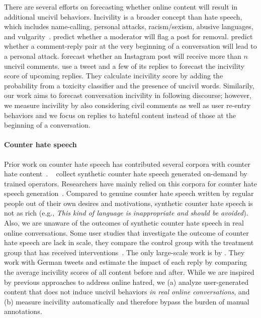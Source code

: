 \documentclass[11pt]{article}
\begin{document}
	There are several efforts on forecasting whether online content will result in additional uncivil behaviors. 
	Incivility is a broader concept than hate speech, which includes name-calling, personal attacks, racism/sexism, abusive languages, and vulgarity~\cite{sadeque-etal-2019-incivility,davidson-etal-2020-developing}.
	\citet{10.1145/2998181.2998213} predict whether a moderator will flag a post for removal.
	\citet{zhang-etal-2018-conversations} predict whether a comment-reply pair at the very beginning of a conversation will lead to a personal attack.
	\citet{DBLP:conf/icwsm/LiuGHC18} forecast whether an Instagram post will receive more than $n$ uncivil comments.
	\citet{DBLP:conf/kdd/DahiyaSSGCEMB021} use a tweet and a few of its replies to forecast the incivility score of upcoming replies.
	They calculate incivility score by adding the probability from a toxicity classifier and the presence of uncivil words.
	Similarily, our work aims to forecast conversation incivility in following discourse; 
	however, we measure incivility by also considering civil comments as well as user re-entry behaviors
	and 
	we focus on replies to hateful content instead of those at the beginning of a conversation.
	
	\paragraph{Counter hate speech}
	Prior work on counter hate speech has contributed several corpora with counter hate content~\cite{DBLP:conf/icwsm/MathewSTRSMG019,qian-etal-2019-benchmark,chung-etal-2019-conan,yu-etal-2022-hate}.
	~\citet{chung-etal-2019-conan} collect synthetic counter hate speech generated on-demand by trained operators.
	Researchers have mainly relied on this corpora for counter hate speech  generation~\cite{tekiroglu-etal-2020-generating,fanton-etal-2021-human,zhu-bhat-2021-generate,ashida-komachi-2022-towards}. 
	Compared to genuine counter hate speech written by regular people out of their own desires and motivations, synthetic counter hate speech is not as rich (e.g., \emph{This kind of language is inappropriate and should be avoided}).
	Also, we are unaware of the outcomes of synthetic counter hate speech in real online conversations.
	Some user studies that investigate the outcome of counter hate speech are lack in scale, they compare the control group with the treatment group that has received interventions~\cite{munger2017tweetment,hangartner2021empathy,bilewicz2021artificial}. 
	The only large-scale work is by \citet{garland2022impact}.
	They work with German tweets and estimate the impact of each reply by comparing the 
	average incivility scores of all content before and after.
	While we are inspired by previous approaches to address online hatred, we
	(a) analyze user-generated content that does not induce uncivil behaviors \emph{in real online conversations}, and
	(b) measure incivility automatically and therefore bypass the burden of manual annotations.
	
\end{document}
